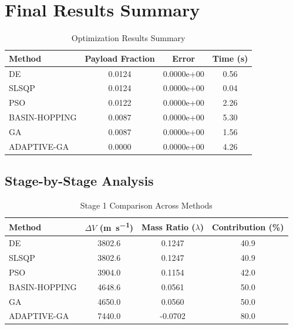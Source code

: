 \documentclass{article}
\begin{document}
\section{Final Results Summary}
\begin{table}[H]
\centering
\caption{Optimization Results Summary}
\begin{tabular}{lS[table-format=1.4]S[table-format=1.4e-1]S[table-format=1.2]}
\toprule
Method & {Payload Fraction} & {Error} & {Time (\si{\second})} \\
\midrule
DE           & 0.0124 & 0.0000e+00 & 0.56 \\
SLSQP        & 0.0124 & 0.0000e+00 & 0.04 \\
PSO          & 0.0122 & 0.0000e+00 & 2.26 \\
BASIN-HOPPING & 0.0087 & 0.0000e+00 & 5.30 \\
GA           & 0.0087 & 0.0000e+00 & 1.56 \\
ADAPTIVE-GA  & 0.0000 & 0.0000e+00 & 4.26 \\
\bottomrule
\end{tabular}
\end{table}

\subsection{Stage-by-Stage Analysis}


\begin{table}[H]
\centering
\caption{Stage 1 Comparison Across Methods}
\begin{tabular}{lS[table-format=4.1]S[table-format=1.4]S[table-format=3.1]}
\toprule
Method & {$\Delta V$ (\si{\meter\per\second})} & {Mass Ratio ($\lambda$)} & {Contribution (\%)} \\
\midrule
DE           & 3802.6 & 0.1247 & 40.9 \\
SLSQP        & 3802.6 & 0.1247 & 40.9 \\
PSO          & 3904.0 & 0.1154 & 42.0 \\
BASIN-HOPPING & 4648.6 & 0.0561 & 50.0 \\
GA           & 4650.0 & 0.0560 & 50.0 \\
ADAPTIVE-GA  & 7440.0 & -0.0702 & 80.0 \\
\bottomrule
\end{tabular}
\end{table}
\end{document}
